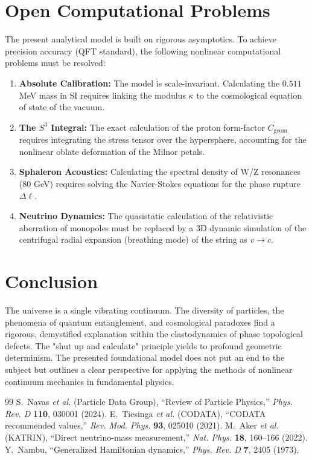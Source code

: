 \documentclass[12pt,a4paper]{article}
\begin{document}
\section{Open Computational Problems}
The present analytical model is built on rigorous asymptotics. To achieve precision accuracy (QFT standard), the following nonlinear computational problems must be resolved:
\begin{enumerate}
    \item \textbf{Absolute Calibration:} The model is scale-invariant. Calculating the $0.511$ MeV mass in SI requires linking the modulus $\kappa$ to the cosmological equation of state of the vacuum.
    \item \textbf{The $S^3$ Integral:} The exact calculation of the proton form-factor $C_{\text{geom}}$ requires integrating the stress tensor over the hypersphere, accounting for the nonlinear oblate deformation of the Milnor petals.
    \item \textbf{Sphaleron Acoustics:} Calculating the spectral density of W/Z resonances (80 GeV) requires solving the Navier-Stokes equations for the phase rupture $\Delta \ell$.
    \item \textbf{Neutrino Dynamics:} The quasistatic calculation of the relativistic aberration of monopoles must be replaced by a 3D dynamic simulation of the centrifugal radial expansion (breathing mode) of the string as $v \to c$.
\end{enumerate}

\section*{Conclusion}
The universe is a single vibrating continuum. The diversity of particles, the phenomena of quantum entanglement, and cosmological paradoxes find a rigorous, demystified explanation within the elastodynamics of phase topological defects. The "shut up and calculate" principle yields to profound geometric determinism. The presented foundational model does not put an end to the subject but outlines a clear perspective for applying the methods of nonlinear continuum mechanics in fundamental physics.

\begin{thebibliography}{99}
 S.~Navas \textit{et al.} (Particle Data Group), ``Review of Particle Physics,'' \textit{Phys. Rev. D} \textbf{110}, 030001 (2024).
 E.~Tiesinga \textit{et al.} (CODATA), ``CODATA recommended values,'' \textit{Rev. Mod. Phys.} \textbf{93}, 025010 (2021).
 M.~Aker \textit{et al.} (KATRIN), ``Direct neutrino-mass measurement,'' \textit{Nat. Phys.} \textbf{18}, 160--166 (2022).
 Y.~Nambu, ``Generalized Hamiltonian dynamics,'' \textit{Phys. Rev. D} \textbf{7}, 2405 (1973).
\end{thebibliography}
\end{document}
